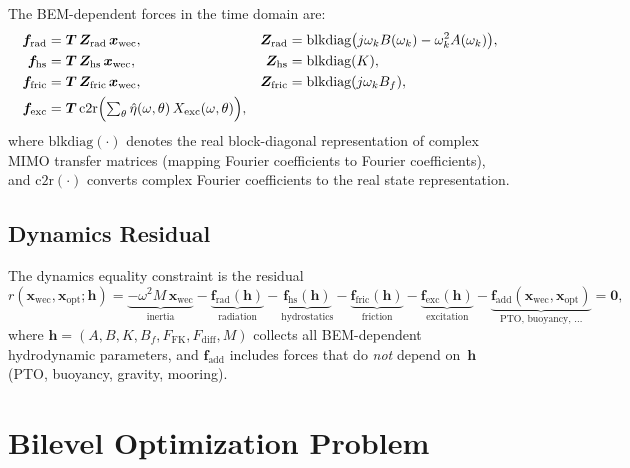 \documentclass[11pt,a4paper]{article}
\newcommand{\xwec}{\bm{x}_{\mathrm{wec}}}
\newcommand{\xopt}{\bm{x}_{\mathrm{opt}}}
\newcommand{\bh}{\bm{h}}
\begin{document}
The BEM-dependent forces in the time domain are:
\begin{align}
    \bm{f}_{\mathrm{rad}} &= \bm{T}\,\bm{Z}_{\mathrm{rad}}\,\xwec,
    &\bm{Z}_{\mathrm{rad}} &= \text{blkdiag}\bigl(
        j\omega_k B(\omega_k) - \omega_k^2 A(\omega_k)\bigr),
    \label{eq:f_rad} \\
    \bm{f}_{\mathrm{hs}} &= \bm{T}\,\bm{Z}_{\mathrm{hs}}\,\xwec,
    &\bm{Z}_{\mathrm{hs}} &= \text{blkdiag}(K),
    \label{eq:f_hs} \\
    \bm{f}_{\mathrm{fric}} &= \bm{T}\,\bm{Z}_{\mathrm{fric}}\,\xwec,
    &\bm{Z}_{\mathrm{fric}} &= \text{blkdiag}(j\omega_k B_f),
    \label{eq:f_fric} \\
    \bm{f}_{\mathrm{exc}} &= \bm{T}\,\mathrm{c2r}\Bigl(
        \textstyle\sum_\theta \hat{\eta}(\omega,\theta)\,
        X_{\mathrm{exc}}(\omega,\theta)\Bigr),
    \label{eq:f_exc}
\end{align}
where $\text{blkdiag}(\cdot)$ denotes the real block-diagonal
representation of complex MIMO transfer matrices (mapping Fourier
coefficients to Fourier coefficients), and $\mathrm{c2r}(\cdot)$
converts complex Fourier coefficients to the real state
representation.

\subsection{Dynamics Residual}

The dynamics equality constraint is the residual
\begin{equation}
\label{eq:residual}
    r(\xwec, \xopt; \bh)
    = \underbrace{-\omega^2 M\,\xwec}_{\text{inertia}}
    - \underbrace{\bm{f}_{\mathrm{rad}}(\bh)}_{\text{radiation}}
    - \underbrace{\bm{f}_{\mathrm{hs}}(\bh)}_{\text{hydrostatics}}
    - \underbrace{\bm{f}_{\mathrm{fric}}(\bh)}_{\text{friction}}
    - \underbrace{\bm{f}_{\mathrm{exc}}(\bh)}_{\text{excitation}}
    - \underbrace{\bm{f}_{\mathrm{add}}(\xwec, \xopt)}_{\text{PTO, buoyancy, \ldots}}
    = \bm{0},
\end{equation}
where $\bh = (A, B, K, B_f, F_{\mathrm{FK}}, F_{\mathrm{diff}}, M)$
collects all BEM-dependent hydrodynamic parameters, and
$\bm{f}_{\mathrm{add}}$ includes forces that do \emph{not} depend
on~$\bh$ (PTO, buoyancy, gravity, mooring).


\section{Bilevel Optimization Problem}
\label{sec:bilevel}
\end{document}
